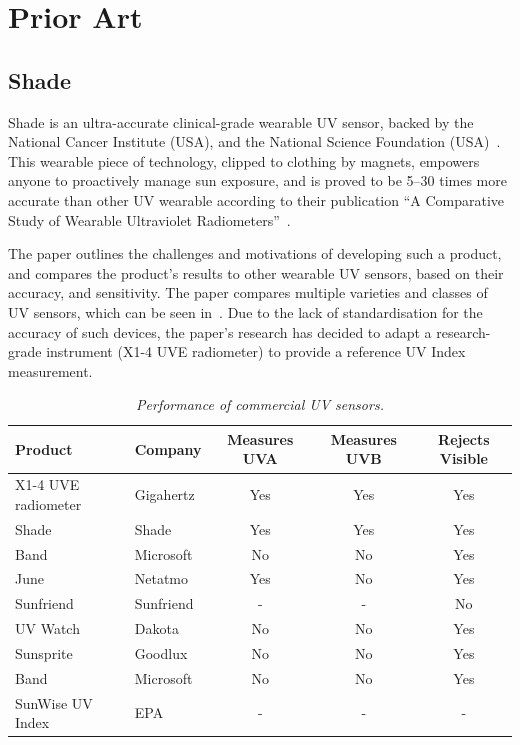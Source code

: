 \documentclass[12pt,openany,a4paper]{book}
\newcommand{\tab}[1]  {Table~\ref{#1}}		%
\begin{document}
\section{Prior Art}
\label{secn:prior_art}

\subsection{Shade}

Shade is an ultra-accurate clinical-grade wearable UV sensor, backed by the
National Cancer Institute (USA), and the National Science Foundation
(USA)~\cite{wearshade_intro}. This
wearable piece of technology, clipped to clothing by magnets, empowers anyone to
proactively manage sun exposure, and is proved to be 5--30 times more accurate
than other UV wearable according to their publication ``A Comparative Study of
Wearable Ultraviolet Radiometers''~\cite{banerjee}.

The paper outlines the challenges and
motivations of developing such a product, and compares the product's results to
other wearable UV sensors, based on their accuracy, and sensitivity. The paper
compares multiple varieties and classes of UV sensors, which can be seen
in~\cite[\tab{tab:uv_sensors}]{banerjee}. Due to the lack of standardisation for the
accuracy of such devices, the paper's research has decided to adapt a
research-grade instrument (X1-4 UVE radiometer) to provide a reference UV Index
measurement.

\begin{table}[h]
\caption{\sl Performance of commercial UV sensors.}
\label{tab:uv_sensors}
\begin{center}
\begin{tabular}{|l|l|c|c|c|}
\hline
Product & Company & Measures UVA & Measures UVB & Rejects Visible \\
\hline
X1-4 UVE radiometer & Gigahertz & Yes & Yes & Yes \\
Shade & Shade & Yes & Yes & Yes \\
Band & Microsoft & No & No & Yes \\
June & Netatmo & Yes & No & Yes \\
Sunfriend & Sunfriend & - & - & No \\
UV Watch & Dakota & No & No & Yes \\
Sunsprite & Goodlux & No & No & Yes \\
Band & Microsoft & No & No & Yes \\
SunWise UV Index & EPA & - & - & - \\
\hline
\end{tabular}
\end{center}
\end{table}
\end{document}
